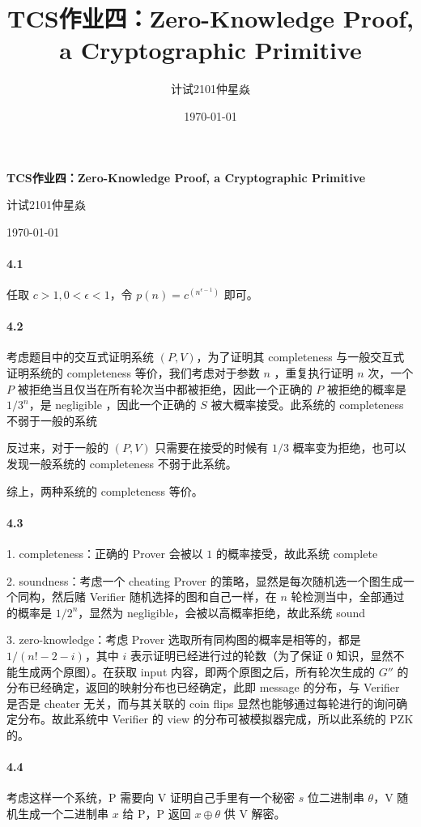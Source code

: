 \documentclass[12pt, a4paper, oneside]{ctexart}
\title{\textbf{TCS作业四：Zero-Knowledge Proof, a Cryptographic Primitive}}
\author{计试2101仲星焱}
\date{\today}
\begin{document}
	\textbf{TCS作业四：Zero-Knowledge Proof, a Cryptographic Primitive}
	
	计试2101仲星焱
	
	\today
	
	\paragraph{4.1} 任取 $c>1,0<\epsilon<1$，令 $p(n) = c^{(n^{\epsilon -1})}$ 即可。
	
	\paragraph{4.2} 考虑题目中的交互式证明系统 $(P,V)$，为了证明其 completeness 与一般交互式证明系统的 completeness 等价，我们考虑对于参数 $n$ ，重复执行证明 $n$ 次，一个 $P$ 被拒绝当且仅当在所有轮次当中都被拒绝，因此一个正确的 $P$ 被拒绝的概率是 ${1}/{3^n}$，是 negligible ，因此一个正确的 $S$ 被大概率接受。此系统的 completeness 不弱于一般的系统
	
	反过来，对于一般的 $(P,V)$ 只需要在接受的时候有 $1/3$ 概率变为拒绝，也可以发现一般系统的 completeness 不弱于此系统。
	
	综上，两种系统的 completeness 等价。
	
	\paragraph{4.3}
	
	1. completeness：正确的 Prover 会被以 $1$ 的概率接受，故此系统 complete
	
	2. soundness：考虑一个 cheating Prover 的策略，显然是每次随机选一个图生成一个同构，然后赌 Verifier 随机选择的图和自己一样，在 $n$ 轮检测当中，全部通过的概率是 $1/2^n$，显然为 negligible，会被以高概率拒绝，故此系统 sound
	
	3. zero-knowledge：考虑 Prover 选取所有同构图的概率是相等的，都是 $1/(n!-2-i)$，其中 $i$ 表示证明已经进行过的轮数（为了保证 $0$ 知识，显然不能生成两个原图）。在获取 input 内容，即两个原图之后，所有轮次生成的 $G''$ 的分布已经确定，返回的映射分布也已经确定，此即 message 的分布，与 Verifier 是否是 cheater 无关，而与其关联的 coin flips 显然也能够通过每轮进行的询问确定分布。故此系统中 Verifier 的 view 的分布可被模拟器完成，所以此系统的 PZK 的。
	
	\paragraph{4.4} 
	
	考虑这样一个系统，P 需要向 V 证明自己手里有一个秘密 $s$ 位二进制串 $\theta$，V 随机生成一个二进制串 $x$ 给 P，P 返回 $x\oplus \theta$ 供 V 解密。
	
\end{document}
